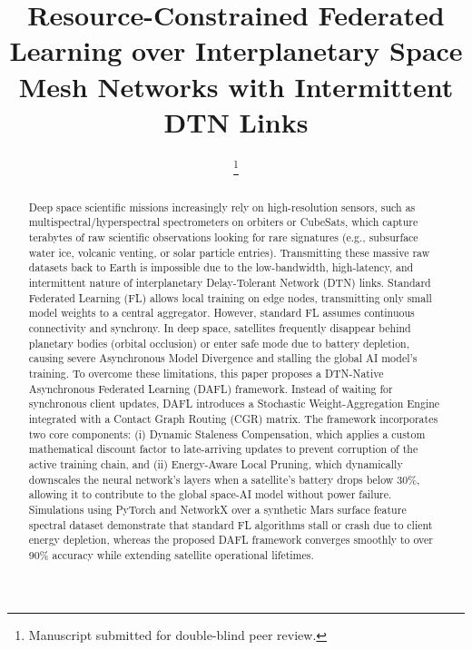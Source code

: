 \documentclass[journal,twocolumn]{IEEEtran}
\begin{document}
\title{Resource-Constrained Federated Learning over Interplanetary Space Mesh Networks with Intermittent DTN Links}

\author{%
  \thanks{Manuscript submitted for double-blind peer review.}
}

\maketitle

\begin{abstract}
Deep space scientific missions increasingly rely on high-resolution sensors, such as multispectral/hyperspectral spectrometers on orbiters or CubeSats, which capture terabytes of raw scientific observations looking for rare signatures (e.g., subsurface water ice, volcanic venting, or solar particle entries). Transmitting these massive raw datasets back to Earth is impossible due to the low-bandwidth, high-latency, and intermittent nature of interplanetary Delay-Tolerant Network (DTN) links. Standard Federated Learning (FL) allows local training on edge nodes, transmitting only small model weights to a central aggregator. However, standard FL assumes continuous connectivity and synchrony. In deep space, satellites frequently disappear behind planetary bodies (orbital occlusion) or enter safe mode due to battery depletion, causing severe Asynchronous Model Divergence and stalling the global AI model's training. To overcome these limitations, this paper proposes a DTN-Native Asynchronous Federated Learning (DAFL) framework. Instead of waiting for synchronous client updates, DAFL introduces a Stochastic Weight-Aggregation Engine integrated with a Contact Graph Routing (CGR) matrix. The framework incorporates two core components: (i) Dynamic Staleness Compensation, which applies a custom mathematical discount factor to late-arriving updates to prevent corruption of the active training chain, and (ii) Energy-Aware Local Pruning, which dynamically downscales the neural network's layers when a satellite's battery drops below 30\%, allowing it to contribute to the global space-AI model without power failure. Simulations using PyTorch and NetworkX over a synthetic Mars surface feature spectral dataset demonstrate that standard FL algorithms stall or crash due to client energy depletion, whereas the proposed DAFL framework converges smoothly to over 90\% accuracy while extending satellite operational lifetimes.
\end{abstract}
\end{document}
